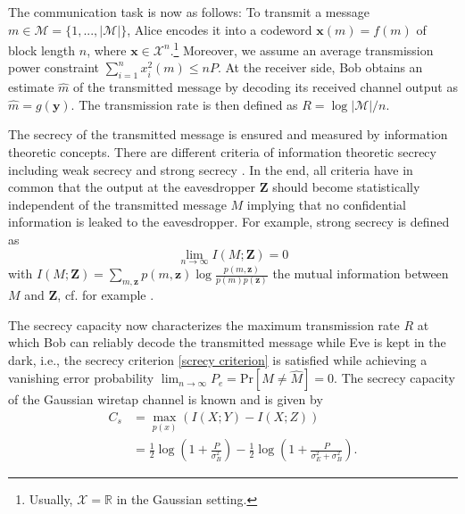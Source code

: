 \documentclass[conference]{IEEEtran}
\begin{document}
The communication task is now as follows: To transmit a message $m\in\mathcal{M}=\{1,...,|\mathcal{M}|\}$, Alice encodes it into a codeword $\mathbf{x}(m)=f(m)$ of block length $n$, where $\mathbf{x}\in \mathcal{X}^n$.\footnote{Usually, $\mathcal{X}=\mathbb{R}$ in the Gaussian setting.} Moreover, we assume an average transmission power constraint $\sum_{i=1}^n x_i^2(m)\leq nP$. At the receiver side, Bob obtains an estimate $\hat{m}$ of the transmitted message by decoding its received channel output as $\hat{m}=g(\mathbf{y})$. The transmission rate is then defined as $R=\log|\mathcal{M}|/n$.

The secrecy of the transmitted message is ensured and measured by information theoretic concepts. There are different criteria of information theoretic secrecy including weak secrecy \cite{Wyner75} and strong secrecy \cite{maurer2000strong}. In the end, all criteria have in common that the output at the eavesdropper $\mathbf{Z}$ should become statistically independent of the transmitted message $M$ implying that no confidential information is leaked to the eavesdropper. For example, strong secrecy is defined as \begin{equation}
\lim_{n \rightarrow \infty} I(M;\mathbf{Z})=0
\label{screcy criterion}
\end{equation}
with $I(M;\mathbf{Z})=\sum_{m,\mathbf{z}}p(m,\mathbf{z})\log\frac{p(m,\mathbf{z})}{p(m)p(\mathbf{z})}$ the mutual information between $M$ and $\mathbf{Z}$, cf. for example \cite{CoverThomas06ElementsInformationTheory}.

The secrecy capacity now characterizes the maximum transmission rate $R$ at which Bob can reliably decode the transmitted message while Eve is kept in the dark, i.e., the secrecy criterion \eqref{screcy criterion} is satisfied while achieving a vanishing error probability $\lim_{n\rightarrow \infty} P_e=\text{Pr}[M \neq\hat{M} ]=0$. The secrecy capacity of the Gaussian wiretap channel is known \cite{BlochBarros-2011-PhysicalLayerSecurity,leung1978gaussian} and is given by
\begin{align}
C_s&=\max_{p(x)}\left(I(X;Y)- I(X;Z) \right)\label{Eq4}\\ 
&=\frac{1}{2}\log\left(1+\frac{P}{\sigma_{B}^2} \right)-\frac{1}{2}\log \left(1+\frac{P}{\sigma_E^2+\sigma_{B}^2} \right).
\end{align}
\end{document}
